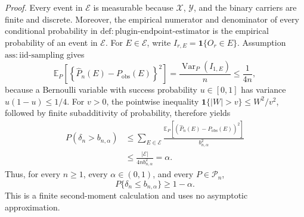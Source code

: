 \noindent\textit{Proof.}
Every event in \(\mathcal E\) is measurable because \(\mathcal X\), \(\mathcal Y\), and the binary carriers are finite and discrete.  Moreover, the empirical numerator and denominator of every conditional probability in \(\mathrm{def{:}plugin\text{-}endpoint\text{-}estimator}\) is the empirical probability of an event in \(\mathcal E\).  For \(E\in\mathcal E\), write \(I_{r,E}=\mathbf 1\{O_r\in E\}\).  Assumption \(\mathrm{ass{:}iid\text{-}sampling}\) gives
\[
\mathbb E_P\!\left[
 \left\{\widehat P_n(E)-P_{\mathrm{obs}}(E)\right\}^{2}
 \right]
=\frac{\operatorname{Var}_P(I_{1,E})}{n}
\le \frac{1}{4n},
\tag{1}
\]
because a Bernoulli variable with success probability \(u\in[0,1]\) has variance \(u(1-u)\le1/4\).  For \(v>0\), the pointwise inequality \(\mathbf 1\{|W|>v\}\le W^2/v^2\), followed by finite subadditivity of probability, therefore yields
\[
\begin{aligned}
P(\delta_n>b_{n,\alpha})
&\le \sum_{E\in\mathcal E}
 \frac{\mathbb E_P[(\widehat P_n(E)-P_{\mathrm{obs}}(E))^2]}
      {b_{n,\alpha}^2}\\
&\le\frac{|\mathcal E|}{4n b_{n,\alpha}^2}=\alpha.
\end{aligned}
\tag{2}
\]
Thus, for every \(n\ge1\), every \(\alpha\in(0,1)\), and every \(P\in\mathcal P_n\),
\[
P\{\delta_n\le b_{n,\alpha}\}\ge1-\alpha.
\tag{3}
\]
This is a finite second-moment calculation and uses no asymptotic approximation.

